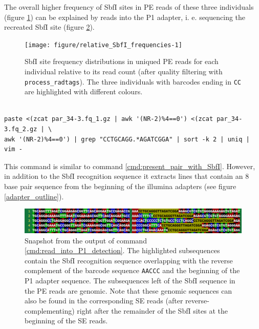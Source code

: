 \documentclass[a4paper,12pt,times,print,index,custombib,custommargin]{PhDThesisPSnPDF}\usepackage[]{graphicx}\usepackage[]{color}
\newenvironment{knitrout}{}{} %
\begin{document}
%
The overall higher frequency of SbfI sites in PE reads of these three individuals (figure \ref{relative_SbfI_frequencies}) can be explained by reads into the P1 adapter, i. e. sequencing the recreated SbfI site (figure \ref{par_34-3_SbfI_PE_read_into_P1}).
%
\begin{figure}
\begin{knitrout}
\color{fgcolor}

{\centering \texttt{[image: figure/relative\_SbfI\_frequencies-1]} 

}



\end{knitrout}
\caption{SbfI site frequency distributions in uniqued PE reads for each individual relative to its read count (after quality filtering with \texttt{process\_radtags}). The three individuals with barcodes ending in \texttt{CC} are highlighted with different colours.}
\label{relative_SbfI_frequencies}
\end{figure}
%
\begin{cmd}
\captionsetup{type=cmd}
\begin{Verbatim}[fontsize=\scriptsize, formatcom=\color{darkgray}]

paste <(zcat par_34-3.fq_1.gz | awk '(NR-2)%4==0') <(zcat par_34-3.fq_2.gz | \
awk '(NR-2)%4==0') | grep "CCTGCAGG.*AGATCGGA" | sort -k 2 | uniq | vim -
\end{Verbatim}
\caption{\small This command is similar to command \ref{cmd:present_pair_with_SbfI}. However, in addition to the SbfI recognition sequence it extracts lines that contain an 8 base pair sequence from the beginning of the illumina adapters (see figure \ref{adapter_outline}).}
\label{cmd:read_into_P1_detection}
\end{cmd}
%
\begin{figure}
\centering
\includegraphics[width=\textwidth]{par_34-3_SbfI_PE_read_into_P1}
\caption{Snapshot from the output of command \ref{cmd:read_into_P1_detection}. The highlighted subsequences contain the SbfI recognition sequence overlapping with the reverse complement of the barcode sequence \texttt{AACCC} and the beginning of the P1 adapter sequence. The subsequences left of the SbfI sequence in the PE reads are genomic. Note that these genomic sequences can also be found in the corresponding SE reads (after reverse-complementing) right after the remainder of the SbfI sites at the beginning of the SE reads.}
\label{par_34-3_SbfI_PE_read_into_P1}
\end{figure}
\end{document}
